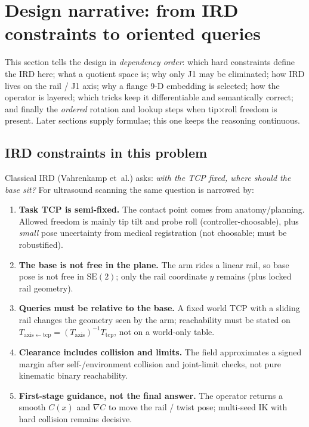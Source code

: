 \documentclass[11pt,a4paper]{article}
\newcommand{\SE}{\mathrm{SE}}
\newcommand{\Tcp}{T_{\mathrm{tcp}}}
\newcommand{\Taxis}{T_{\mathrm{axis}}}
\begin{document}
\section{Design narrative: from IRD constraints to oriented queries}
\label{sec:narrative}

This section tells the design in \emph{dependency order}: which hard constraints
define the IRD here; what a quotient space is; why only J1 may be eliminated;
how IRD lives on the rail / J1 axis; why a flange 9-D embedding is selected;
how the operator is layered; which tricks keep it differentiable and
semantically correct; and finally the \emph{ordered} rotation and
lookup steps when tip$\times$roll freedom is present. Later sections supply
formulae; this one keeps the reasoning continuous.

\subsection{IRD constraints in this problem}
\label{sec:ird-constraints}

Classical IRD (Vahrenkamp et~al.) asks: \emph{with the TCP fixed, where should
the base sit?} For ultrasound scanning the same question is narrowed by:

\begin{enumerate}[leftmargin=1.6em]
  \item \textbf{Task TCP is semi-fixed.}
        The contact point comes from anatomy/planning. Allowed freedom is mainly
        tip tilt and probe roll (controller-choosable), plus \emph{small}
        pose uncertainty from medical registration (not choosable; must be
        robustified).
  \item \textbf{The base is not free in the plane.}
        The arm rides a linear rail, so base pose is not free in \(\SE(2)\);
        only the rail coordinate \(y\) remains (plus locked rail geometry).
  \item \textbf{Queries must be relative to the base.}
        A fixed world TCP with a sliding rail changes the geometry seen by the
        arm; reachability must be stated on
        \(T_{\mathrm{axis\leftarrow tcp}}=(\Taxis)^{-1}\Tcp\), not on a
        world-only table.
  \item \textbf{Clearance includes collision and limits.}
        The field approximates a signed margin after self-/environment
        collision and joint-limit checks, not pure kinematic binary reachability.
  \item \textbf{First-stage guidance, not the final answer.}
        The operator returns a smooth \(C(x)\) and \(\nabla C\) to move the
        rail / twist pose; multi-seed IK with hard collision remains decisive.
\end{enumerate}
\end{document}
